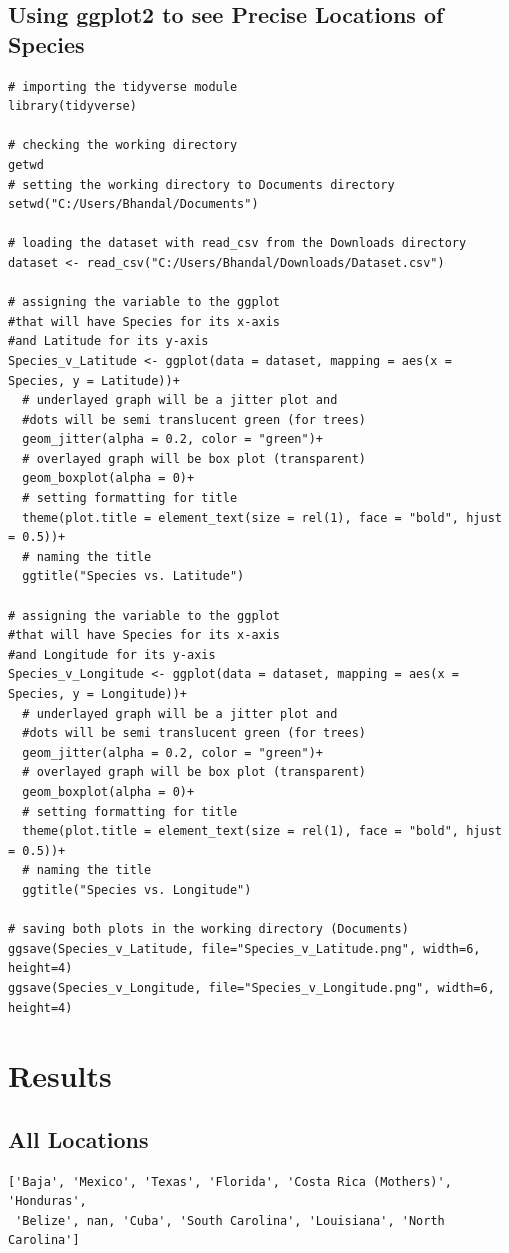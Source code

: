 \documentclass[letterpaper]{article}
\begin{document}
\subsection{Using ggplot2 to see Precise Locations of Species}
\begin{verbatim}
# importing the tidyverse module
library(tidyverse)

# checking the working directory
getwd
# setting the working directory to Documents directory
setwd("C:/Users/Bhandal/Documents")

# loading the dataset with read_csv from the Downloads directory
dataset <- read_csv("C:/Users/Bhandal/Downloads/Dataset.csv")

# assigning the variable to the ggplot
#that will have Species for its x-axis
#and Latitude for its y-axis
Species_v_Latitude <- ggplot(data = dataset, mapping = aes(x = Species, y = Latitude))+
  # underlayed graph will be a jitter plot and
  #dots will be semi translucent green (for trees)
  geom_jitter(alpha = 0.2, color = "green")+
  # overlayed graph will be box plot (transparent)
  geom_boxplot(alpha = 0)+
  # setting formatting for title
  theme(plot.title = element_text(size = rel(1), face = "bold", hjust = 0.5))+
  # naming the title
  ggtitle("Species vs. Latitude")

# assigning the variable to the ggplot
#that will have Species for its x-axis
#and Longitude for its y-axis
Species_v_Longitude <- ggplot(data = dataset, mapping = aes(x = Species, y = Longitude))+
  # underlayed graph will be a jitter plot and
  #dots will be semi translucent green (for trees)
  geom_jitter(alpha = 0.2, color = "green")+
  # overlayed graph will be box plot (transparent)
  geom_boxplot(alpha = 0)+
  # setting formatting for title
  theme(plot.title = element_text(size = rel(1), face = "bold", hjust = 0.5))+
  # naming the title
  ggtitle("Species vs. Longitude")

# saving both plots in the working directory (Documents)
ggsave(Species_v_Latitude, file="Species_v_Latitude.png", width=6, height=4)
ggsave(Species_v_Longitude, file="Species_v_Longitude.png", width=6, height=4)
\end{verbatim}
\section{Results}
\subsection{All Locations}
\begin{verbatim}
['Baja', 'Mexico', 'Texas', 'Florida', 'Costa Rica (Mothers)', 'Honduras',
 'Belize', nan, 'Cuba', 'South Carolina', 'Louisiana', 'North Carolina']
\end{verbatim}
\end{document}
